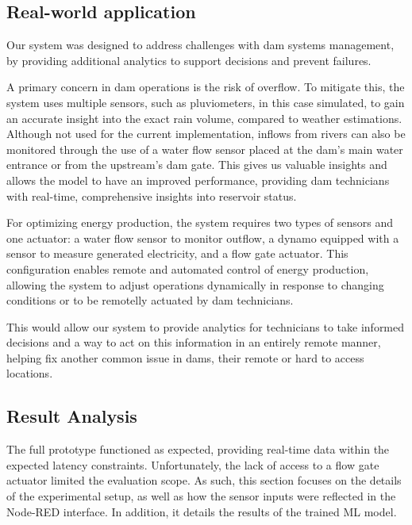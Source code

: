 \subsection{Real-world application}
Our system was designed to address challenges with dam systems management, by providing additional analytics to support decisions and prevent failures.

A primary concern in dam operations is the risk of overflow. To mitigate this, the system uses multiple sensors, such as pluviometers, in this case simulated, to gain an accurate insight into the exact rain volume, compared to weather estimations.
Although not used for the current implementation, inflows from rivers can also be monitored through the use of a water flow sensor placed at the dam's main water entrance or from the upstream's dam gate.
This gives us valuable insights and allows the model to have an improved performance, providing dam technicians with real-time, comprehensive insights into reservoir status.

For optimizing energy production, the system requires two types of sensors and one actuator: a water flow sensor to monitor outflow, a dynamo equipped with a sensor to measure generated electricity, and a flow gate actuator. 
This configuration enables remote and automated control of energy production, allowing the system to adjust operations dynamically in response to changing conditions or to be remotelly actuated by dam technicians.

This would allow our system to provide analytics for technicians to take informed decisions and a way to act on this information in an entirely remote manner, helping fix another common issue in dams, their remote or hard to access locations.

\subsection{Result Analysis}
The full prototype functioned as expected, providing real-time data within the expected latency constraints. Unfortunately, the lack of access to a flow gate actuator limited the evaluation scope. As such, this section focuses on the details of the experimental setup, as well as how the sensor inputs were reflected in the Node-RED interface. In addition, it details the results of the trained ML model.

